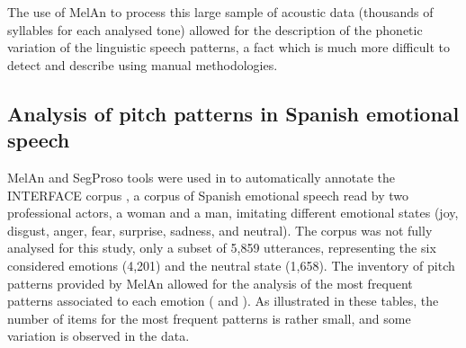 \documentclass[output=paper]{langsci/langscibook}
\begin{document}
\largerpage[2.5]The use of MelAn to process this large sample of acoustic data (thousands of syllables for each analysed tone) allowed for the description of the phonetic variation of the linguistic speech patterns, a fact which is much more difficult to detect and describe using manual methodologies.\largerpage

\subsection{Analysis of pitch patterns in Spanish emotional speech} 

MelAn and SegProso tools were used in \citet{Garrido2011} to automatically annotate the INTERFACE corpus \citep{Hozjan2002}, a corpus of Spanish emotional speech read by two professional actors, a woman and a man, imitating different emotional states (joy, disgust, anger, fear, surprise, sadness, and neutral). The corpus was not fully analysed for this study, only a subset of 5,859 utterances, representing the six considered emotions (4,201) and the neutral state (1,658).  The inventory of pitch patterns provided by MelAn allowed for the analysis of the most frequent patterns associated to each emotion ( and ). As illustrated in these tables, the number of items for the most frequent patterns is rather small, and some variation is observed in the data. 
\end{document}
